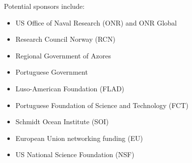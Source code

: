 Potential sponsors include:

\begin{itemize}[noitemsep,topsep=0pt,parsep=0pt,partopsep=0pt]

  \item US Office of Naval Research (ONR) and ONR Global
  \item Research Council Norway (RCN)
  \item Regional Government of Azores
  \item Portuguese Government
  \item Luso-American Foundation (FLAD) 
  \item Portuguese Foundation of Science and Technology (FCT)
  \item Schmidt Ocean Institute (SOI)
  \item European Union networking funding (EU)
  \item US National Science Foundation (NSF)

\end{itemize}



